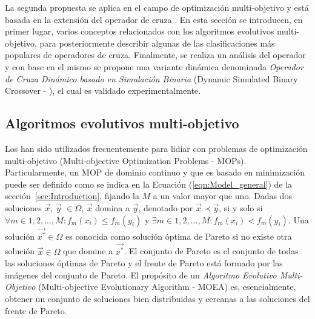 La segunda propuesta se aplica en el campo de optimización multi-objetivo y está basada en la extensión del operador de
cruza \SBX{}.
%
En esta sección se introducen, en primer lugar, varios conceptos relacionados con los algoritmos evolutivos multi-objetivo, 
para posteriormente describir algunas de las clasificaciones más populares de operadores de cruza.
%
Finalmente, se realiza un análisis del operador \SBX{} y con base en el mismo se propone una variante dinámica denominada 
\textit{Operador de Cruza Dinámico basado en Simulación Binaria} (Dynamic Simulated Binary Crossover - \DSBX{}), el cual
es validado experimentalmente.

\subsection{Algoritmos evolutivos multi-objetivo}

Los \EAS{} han sido utilizados frecuentemente para lidiar con problemas de optimización multi-objetivo (Multi-objective Optimization Problems - MOPs).
%
Particularmente, un MOP de dominio continuo y que es basado en minimización puede ser definido como se indica en la Ecuación (\ref{eqn:Model_general}) de la sección~\ref{sec:Introduction}, fijando la $M$
a un valor mayor que uno.
%
Dadas dos soluciones $\vec{x}$, $\vec{y}$ $\in \Omega$, $\vec{x}$ domina a $\vec{y}$, denotado por $\vec{x} \prec \vec{y}$, 
si y solo si $\forall m \in {1,2,...,M} : f_m(x_i) \leq f_m(y_i)$ y $\exists m \in {1,2,...,M} : f_m(x_i) < f_m(y_i)$.
%
Una solución $\vec{x^*} \in \Omega$ es conocida como solución óptima de Pareto si no existe otra solución $\vec{x} \in \Omega$ que domine a $\vec{x^*}$.
%
El conjunto de Pareto es el conjunto de todas las soluciones óptimas de Pareto y el frente de Pareto está formado por las imágenes del conjunto de Pareto.
%
El propósito de un \textit{Algoritmo Evolutivo Multi-Objetivo} (Multi-objective Evolutionary Algorithm - MOEA) es, esencialmente, obtener 
un conjunto de soluciones bien distribuidas y cercanas a las soluciones del frente de Pareto.

